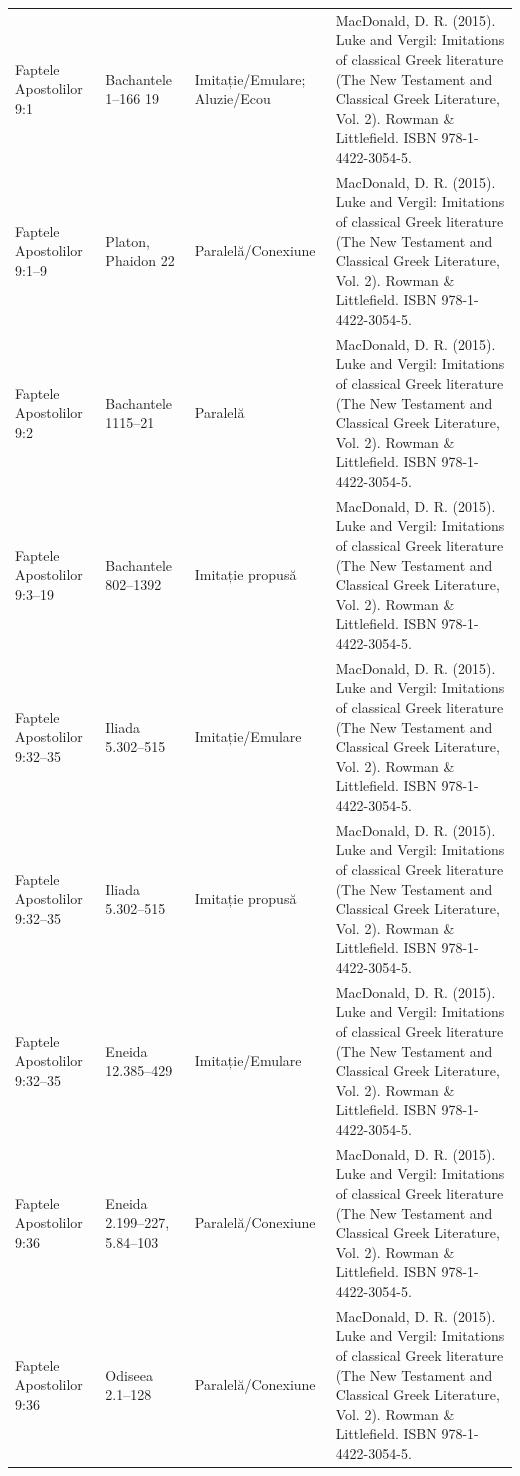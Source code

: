 \documentclass[12pt,a4paper,twoside,openany]{book}
\begin{document}
\begin{longtable}{L{1.4cm}L{1.7cm}L{3.1cm}L{8.4cm}}
Faptele Apostolilor 9:1 & Bachantele 1–166 19 & Imitație/Emulare; Aluzie/Ecou & MacDonald, D. R. (2015). Luke and Vergil: Imitations of classical Greek literature (The New Testament and Classical Greek Literature, Vol. 2). Rowman \& Littlefield. ISBN 978-1-4422-3054-5. \\
Faptele Apostolilor 9:1–9 & Platon, Phaidon 22 & Paralelă/Conexiune & MacDonald, D. R. (2015). Luke and Vergil: Imitations of classical Greek literature (The New Testament and Classical Greek Literature, Vol. 2). Rowman \& Littlefield. ISBN 978-1-4422-3054-5. \\
Faptele Apostolilor 9:2 & Bachantele 1115–21 & Paralelă & MacDonald, D. R. (2015). Luke and Vergil: Imitations of classical Greek literature (The New Testament and Classical Greek Literature, Vol. 2). Rowman \& Littlefield. ISBN 978-1-4422-3054-5. \\
Faptele Apostolilor 9:3–19 & Bachantele 802–1392 & Imitație propusă & MacDonald, D. R. (2015). Luke and Vergil: Imitations of classical Greek literature (The New Testament and Classical Greek Literature, Vol. 2). Rowman \& Littlefield. ISBN 978-1-4422-3054-5. \\
Faptele Apostolilor 9:32–35 & Iliada 5.302–515 & Imitație/Emulare & MacDonald, D. R. (2015). Luke and Vergil: Imitations of classical Greek literature (The New Testament and Classical Greek Literature, Vol. 2). Rowman \& Littlefield. ISBN 978-1-4422-3054-5. \\
Faptele Apostolilor 9:32–35 & Iliada 5.302–515 & Imitație propusă & MacDonald, D. R. (2015). Luke and Vergil: Imitations of classical Greek literature (The New Testament and Classical Greek Literature, Vol. 2). Rowman \& Littlefield. ISBN 978-1-4422-3054-5. \\
Faptele Apostolilor 9:32–35 & Eneida 12.385–429 & Imitație/Emulare & MacDonald, D. R. (2015). Luke and Vergil: Imitations of classical Greek literature (The New Testament and Classical Greek Literature, Vol. 2). Rowman \& Littlefield. ISBN 978-1-4422-3054-5. \\
Faptele Apostolilor 9:36 & Eneida 2.199–227, 5.84–103 & Paralelă/Conexiune & MacDonald, D. R. (2015). Luke and Vergil: Imitations of classical Greek literature (The New Testament and Classical Greek Literature, Vol. 2). Rowman \& Littlefield. ISBN 978-1-4422-3054-5. \\
Faptele Apostolilor 9:36 & Odiseea 2.1–128 & Paralelă/Conexiune & MacDonald, D. R. (2015). Luke and Vergil: Imitations of classical Greek literature (The New Testament and Classical Greek Literature, Vol. 2). Rowman \& Littlefield. ISBN 978-1-4422-3054-5. \\

\end{longtable}
\end{document}
